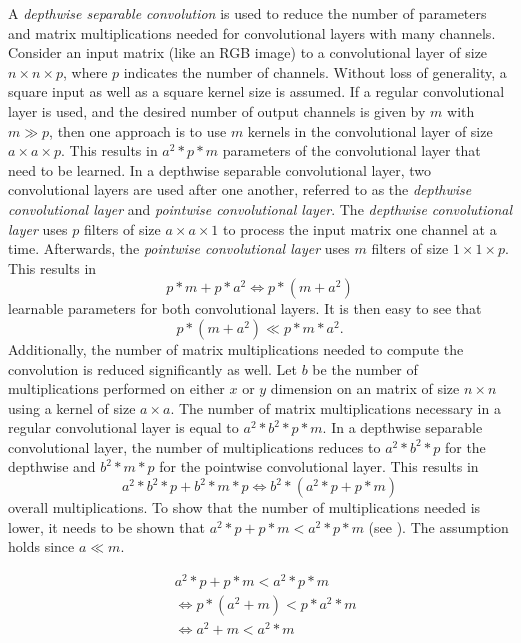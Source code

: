 A \textit{depthwise separable convolution} \cite{sifre_rigid-motion_2014} \cite{chollet_xception:_2017} is used to reduce the number of parameters and matrix multiplications needed for convolutional layers with many channels.
Consider an input matrix (like an RGB image) to a convolutional layer of size $n \times n \times p$, where $p$ indicates the number of channels.
Without loss of generality, a square input as well as a square kernel size is assumed.
If a regular convolutional layer is used, and the desired number of output channels is given by $m$ with $m \gg p$, then one approach is to use $m$ kernels in the convolutional layer of size $a \times a \times p$.
This results in $a^2 * p * m$ parameters of the convolutional layer that need to be learned.
In a depthwise separable convolutional layer, two convolutional layers are used after one another, referred to as the \textit{depthwise convolutional layer} and \textit{pointwise convolutional layer}.
The \textit{depthwise convolutional layer} uses $p$ filters of size $a \times a \times 1$ to process the input matrix one channel at a time.
Afterwards, the \textit{pointwise convolutional layer} uses $m$ filters of size $1 \times 1 \times p$.
This results in $$p * m + p * a^2 \Leftrightarrow p * (m + a^2)$$ learnable parameters for both convolutional layers.
It is then easy to see that $$p * (m + a^2) \ll p * m * a^2.$$
Additionally, the number of matrix multiplications needed to compute the convolution is reduced significantly as well.
Let $b$ be the number of multiplications performed on either $x$ or $y$ dimension on an matrix of size $n \times n$ using a kernel of size $a \times a$.
The number of matrix multiplications necessary in a regular convolutional layer is equal to $a^2 * b^2 * p * m$.
In a depthwise separable convolutional layer, the number of multiplications reduces to $a^2 * b^2 * p $ for the depthwise and $b^2 * m * p$ for the pointwise convolutional layer.
This results in $$a^2 * b^2 * p + b^2 * m * p \Leftrightarrow b^2 * (a^2 * p + p * m) $$ overall multiplications.
To show that the number of multiplications needed is lower, it needs to be shown that $a^2 * p + p * m < a^2 * p * m$ (see ).
The assumption holds since $a \ll m$.

\begin{equation}
    \label{eq:convolution_proof}
    \begin{split}
        &a^2 * p + p * m < a^2 * p * m \\
        &\Leftrightarrow p * (a^2 + m) < p * a^2 * m \\
        &\Leftrightarrow a^2 + m < a^2 * m  
    \end{split}
\end{equation}

